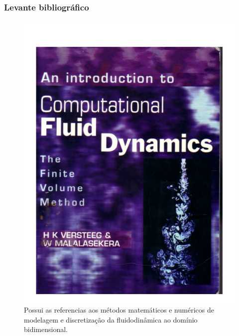 \documentclass[xcolor=dvipsnames,10pt,aspectratio=169]{beamer}
\begin{document}
	\begin{frame}
		\frametitle{Levante bibliográfico}
		\begin{minipage}[h!]{0.33\textwidth}
			\begin{figure}
				\centering
				\includegraphics[page = 1,trim={0.0cm 0.0cm 0.0cm 0.0cm},clip=true, scale = 0.15]{Referencias/An_introduction_to_Computational}
				\caption{Possui as referencias aos métodos matemáticos e numéricos de modelagem e discretização da fluidodinâmica ao domínio bidimensional.}	
			\end{figure}
			\vspace{6cm}
		\end{minipage}
		\begin{minipage}[h!]{0.33\textwidth}
			\begin{figure}
				\centering

\end{figure}
\end{minipage}
\end{frame}
\end{document}
